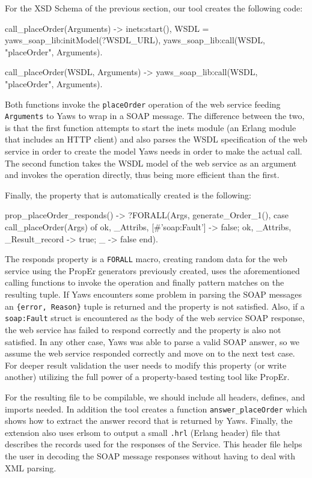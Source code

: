 \documentclass[submission,copyright]{eptcs}
\begin{document}
For the XSD Schema of the previous section, our tool creates the following code:
\begin{lsterlang}[firstnumber=38]
call_placeOrder(Arguments) ->
  inets:start(),
  WSDL = yaws_soap_lib:initModel(?WSDL_URL),
  yaws_soap_lib:call(WSDL, "placeOrder", Arguments).
    
call_placeOrder(WSDL, Arguments) ->
  yaws_soap_lib:call(WSDL, "placeOrder", Arguments).
\end{lsterlang}
Both functions invoke the \texttt{placeOrder} operation of the
web service feeding \texttt{Arguments} to Yaws to wrap in a SOAP
message. The difference between the two, is that the first function
attempts to start the inets module (an Erlang module that includes an
HTTP client) and also parses the WSDL specification of the web service
in order to create the model Yaws needs in order to make the actual
call. The second function takes the WSDL model of the web service as
an argument and invokes the operation directly, thus being more
efficient than the first.

Finally, the property that is automatically created is the following:
\begin{lsterlang}[firstnumber=46]
prop_placeOrder_responds() ->
  ?FORALL(Args, generate_Order_1(),
          case call_placeOrder(Args) of 
            {ok, _Attribs, [#'soap:Fault'{}]} -> false;
            {ok, _Attribs, _Result_record} -> true;
            _ -> false
          end).
\end{lsterlang}

The responds property is a \texttt{FORALL} macro, creating random data
for the web service using the PropEr generators previously created,
uses the aforementioned calling functions to invoke the operation and
finally pattern matches on the resulting tuple. If Yaws encounters
some problem in parsing the SOAP messages an \texttt{\{error,
  Reason\}} tuple is returned and the property is not satisfied. Also,
if a \texttt{soap:Fault} struct is encountered as the body of the web
service SOAP response, the web service has failed to respond correctly
and the property is also not satisfied. In any other case, Yaws was
able to parse a valid SOAP answer, so we assume the web service
responded correctly and move on to the next test case. For deeper
result validation the user needs to modify this property (or write
another) utilizing the full power of a property-based testing tool
like PropEr.

For the resulting file to be compilable, we should include all
headers, defines, and imports needed. In addition the tool creates a
function \texttt{answer\_placeOrder} which shows how to extract the
answer record that is returned by Yaws. Finally, the extension also
uses erlsom to output a small \texttt{.hrl} (Erlang header) file that
describes the records used for the responses of the Service. This
header file helps the user in decoding the SOAP message responses
without having to deal with XML parsing.
\end{document}
